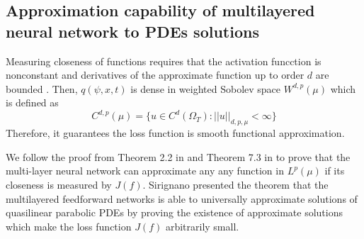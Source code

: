 \documentclass{article}
\begin{document}
\subsection{Approximation capability of multilayered neural network to PDEs solutions}


Measuring closeness of functions requires that the activation funcction is nonconstant and derivatives of the approximate function up to order $d$ are bounded \cite{hornik}. 
Then, $q(\psi,x,t)$ is dense in weighted Sobolev space $W^{d,p}(\mu)$ which is defined as \cite{hornik}
\begin{equation}
C^{d,p}(\mu) = \{ u \in C^{d}(\Omega_{T}): ||u||_{d,p,\mu} < \infty \}
\end{equation}
Therefore, it guarantees the loss function is smooth functional approximation.

We follow the proof from Theorem 2.2 in \cite{kurkova} and Theorem 7.3 in \cite{sirignano} to prove that the multi-layer neural network can approximate any any function in $L^{p}(\mu)$ if its closeness is measured by $J(f)$. 
Sirignano \cite{sirignano} presented the theorem that the multilayered feedforward networks is able to universally approximate solutions of quasilinear parabolic PDEs by proving the existence of approximate solutions which make the loss function $J(f)$ arbitrarily small.
\end{document}
